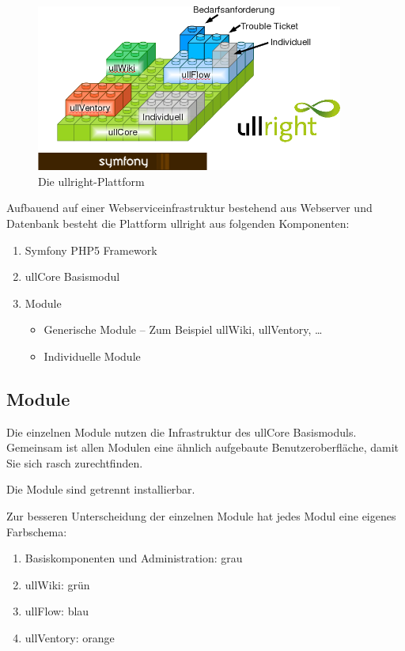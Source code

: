 \documentclass[article, a4paper, oneside, 11pt]{memoir}
\begin{document}
\begin{figure}[htp]
\centering
\includegraphics[width=0.9\textwidth]{figures/ullrightgermanexport-img2.png}
\caption{Die ullright-Plattform}
\label{fig:platform}
\end{figure}

Aufbauend auf einer Webserviceinfrastruktur bestehend aus Webserver und Datenbank besteht die Plattform ullright aus folgenden Komponenten:

\begin{enumerate}
\item Symfony PHP5 Framework
\item ullCore Basismodul
\item Module
\begin{itemize}
\item Generische Module -- Zum Beispiel ullWiki, ullVentory, \ldots
\item Individuelle Module
\end{itemize}
\end{enumerate}
\subsection{Module}
Die einzelnen Module nutzen die Infrastruktur des ullCore Basismoduls. Gemeinsam ist allen Modulen eine ähnlich aufgebaute Benutzeroberfläche, damit Sie sich rasch zurechtfinden.

Die Module sind getrennt installierbar.

Zur besseren Unterscheidung der einzelnen Module hat jedes Modul eine eigenes Farbschema:

\begin{enumerate}
\item Basiskomponenten und Administration: grau
\item ullWiki: grün
\item ullFlow: blau
\item ullVentory: orange
\end{enumerate}
\end{document}

